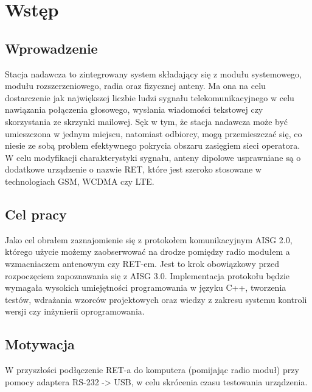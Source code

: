 \tableofcontents

\chapter{Wstęp}
\section{Wprowadzenie}
	Stacja nadawcza to zintegrowany system składający się z modułu systemowego, modułu rozszerzeniowego, radia oraz fizycznej anteny. 
	Ma ona na celu dostarczenie jak największej liczbie ludzi sygnału telekomunikacyjnego w celu nawiązania połączenia głosowego, 
	wysłania wiadomości tekstowej czy skorzystania ze skrzynki mailowej. Sęk w tym, że stacja nadawcza może być umieszczona w jednym miejscu, 
	natomiast odbiorcy, mogą przemieszczać się, co niesie ze sobą problem efektywnego pokrycia obszaru zasięgiem sieci operatora.
	W celu modyfikacji charakterystyki sygnału, anteny dipolowe usprawniane są o dodatkowe urządzenie o nazwie RET, które jest szeroko stosowane w technologiach GSM, WCDMA czy LTE.

\section{Cel pracy}
	Jako cel obrałem zaznajomienie się z protokołem komunikacyjnym AISG 2.0, którego użycie możemy zaobserwować na drodze pomiędzy 
	radio modułem a wzmacniaczem antenowym czy RET-em. 
	Jest to krok obowiązkowy przed rozpoczęciem zapoznawania się z AISG 3.0.
	Implementacja protokołu będzie wymagała wysokich umiejętności programowania w języku C++, 
	tworzenia testów, wdrażania wzorców projektowych oraz wiedzy z zakresu systemu kontroli wersji czy inżynierii oprogramowania.

\section{Motywacja}
	W przyszłości podłączenie RET-a do komputera (pomijając radio moduł) przy pomocy adaptera RS-232 -> USB, w celu skrócenia czasu testowania urządzenia.

